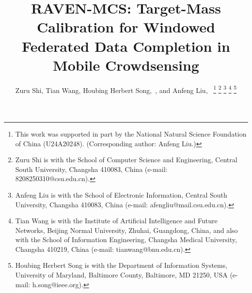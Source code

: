 \documentclass[letterpaper,journal]{IEEEtran}
\begin{document}
\title{RAVEN-MCS: Target-Mass Calibration for Windowed Federated Data Completion in Mobile Crowdsensing}

\author{Zuru Shi, Tian Wang, Houbing Herbert Song,~, and Anfeng Liu,~%
\thanks{This work was supported in part by the National Natural Science Foundation of China (U24A20248). (Corresponding author: Anfeng Liu.)}%
\thanks{Zuru Shi is with the School of Computer Science and Engineering, Central South University, Changsha 410083, China (e-mail: 8208250310@csu.edu.cn).}%
\thanks{Anfeng Liu is with the School of Electronic Information, Central South University, Changsha 410083, China (e-mail: afengliu@mail.csu.edu.cn).}%
\thanks{Tian Wang is with the Institute of Artificial Intelligence and Future Networks, Beijing Normal University, Zhuhai, Guangdong, China, and also with the School of Information Engineering, Changsha Medical University, Changsha 410219, China (e-mail: tianwang@bnu.edu.cn).}%
\thanks{Houbing Herbert Song is with the Department of Information Systems, University of Maryland, Baltimore County, Baltimore, MD 21250, USA (e-mail: h.song@ieee.org).}%
}


\maketitle
\end{document}
